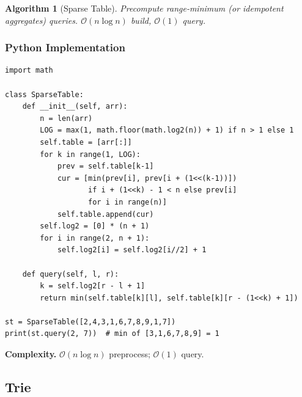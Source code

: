 \documentclass[10pt,a4paper]{article}
\theoremstyle{cpstyle}
\newtheorem{algorithm}[theorem]{Algorithm}
\newcommand{\bigO}[1]{\mathcal{O}\!\left(#1\right)}
\begin{document}
\begin{algorithm}[Sparse Table]
Precompute range-minimum (or idempotent aggregates) queries. $\bigO{n \log n}$ build, $\bigO{1}$ query.
\end{algorithm}

\subsubsection{Python Implementation}
\begin{lstlisting}[caption={Sparse Table for RMQ (range minimum query)}]
import math

class SparseTable:
    def __init__(self, arr):
        n = len(arr)
        LOG = max(1, math.floor(math.log2(n)) + 1) if n > 1 else 1
        self.table = [arr[:]]
        for k in range(1, LOG):
            prev = self.table[k-1]
            cur = [min(prev[i], prev[i + (1<<(k-1))])
                   if i + (1<<k) - 1 < n else prev[i]
                   for i in range(n)]
            self.table.append(cur)
        self.log2 = [0] * (n + 1)
        for i in range(2, n + 1):
            self.log2[i] = self.log2[i//2] + 1

    def query(self, l, r):
        k = self.log2[r - l + 1]
        return min(self.table[k][l], self.table[k][r - (1<<k) + 1])

st = SparseTable([2,4,3,1,6,7,8,9,1,7])
print(st.query(2, 7))  # min of [3,1,6,7,8,9] = 1
\end{lstlisting}

\textbf{Complexity.} $\bigO{n \log n}$ preprocess; $\bigO{1}$ query.

\subsection{Trie}
\end{document}
